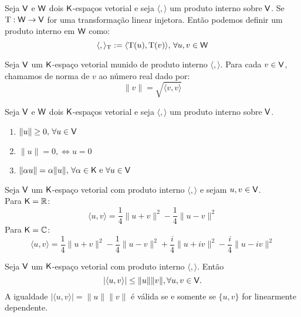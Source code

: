 \documentclass[10pt,a4paper]{book}
\begin{document}
\begin{definition}
	Seja $\mathsf{ V }$ e $\mathsf{ W }$ dois $\mathsf{ K }$-espaços vetorial e seja $\langle , \rangle$ um produto interno sobre $\mathsf{ V }$. Se $\mathrm{ T } : \mathsf{ W } \rightarrow \mathsf{ V }$ for uma transformação linear injetora. Então podemos definir um produto interno em $\mathsf{ W }$ como:
	\[
		\langle , \rangle_{\mathrm{ T }} := \langle \mathrm{ T }(u), \mathrm{ T }(v) \rangle, \, \forall u, v \in \mathsf{ W }
	\]
\end{definition}

\begin{definition}[Norma]
	Seja $\mathsf{ V }$ um $\mathsf{ K }$-espaço vetorial munido de produto interno $\langle , \rangle$. Para cada $v \in \mathsf{ V }$, chamamos de norma de $v$ ao número real dado por:
	\[
		\lVert v \rVert = \sqrt{\langle v, v \rangle}
	\]
\end{definition}

\begin{lemma}
	Seja $\mathsf{ V }$ e $\mathsf{ W }$ dois $\mathsf{ K }$-espaços vetorial e seja $\langle , \rangle$ um produto interno sobre $\mathsf{ V }$.
	\begin{enumerate}
		\item $\lVert u \rVert \geq 0, \, \forall u \in \mathsf{ V }$
		\item $\lVert u \rVert = 0, \Leftrightarrow u = 0$
		\item $\lVert \alpha u \rVert = \alpha \lVert u \rVert, \, \forall \alpha \in \mathsf{ K } \text{ e } \forall u \in \mathsf{ V }$
	\end{enumerate}
\end{lemma}

\begin{proposition}
	Seja $\mathsf{ V }$ um $\mathsf{ K }$-espaço vetorial com produto interno $\langle, \rangle$ e sejam $u, v \in \mathsf{ V }$. \\
	Para $\mathsf{ K } = \mathbb{ R }$:
	\[
		\langle u, v \rangle = \frac{1}{4} \lVert u + v \rVert ^ 2 - \frac{1}{4} \lVert u - v \rVert ^ 2
	\] 
	Para $\mathsf{ K } = \mathbb{ C }$:
	\[
		\langle u, v \rangle = \frac{1}{4} \lVert u + v \rVert ^ 2 - \frac{1}{4} \lVert u - v \rVert ^ 2 +
		\frac{i}{4} \lVert u + iv \rVert ^ 2 - \frac{i}{4} \lVert u - iv \rVert ^ 2
	\] 
\end{proposition}

\begin{theorem}
	Seja $\mathsf{ V }$ um $\mathsf{ K }$-espaço vetorial com produto interno $\langle, \rangle$. Então
	\[
		|\langle u, v \rangle| \leq \lVert u \rVert \lVert v \rVert, \forall u, v\in \mathsf{ V }.
	\]
	A igualdade $|\langle u, v \rangle| = \lVert u \rVert \lVert v \rVert$ é válida se e somente se $\{u, v\}$ for linearmente dependente.
\end{theorem}
\end{document}
